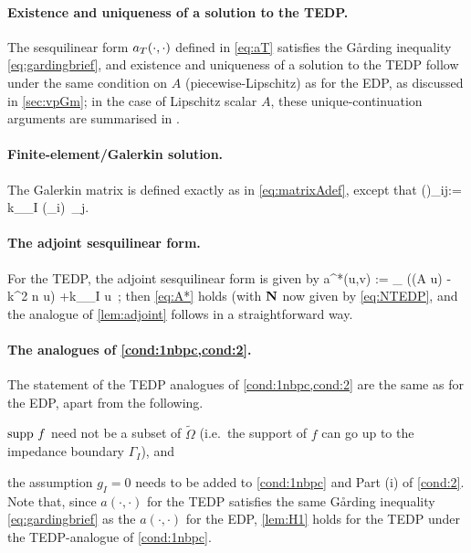 \paragraph{Existence and uniqueness of a solution to the TEDP.} The sesquilinear form $a_{T}(\cdot,\cdot)$ defined in \cref{eq:aT} satisfies the G\aa rding inequality \cref{eq:gardingbrief}, and existence and uniqueness of a solution to the TEDP follow under the same condition on $A$ (piecewise-Lipschitz) as for the EDP, as discussed in \cref{sec:vpGm}; in the case of Lipschitz scalar $A$, these unique-continuation arguments are summarised in \cite[\S2]{GrSa:18}.

\paragraph{Finite-element/Galerkin solution.}
The Galerkin matrix is defined exactly as in \cref{eq:matrixAdef}, except that 
\beq\label{eq:NTEDP}
\big(\Nmat\big)_{ij}:= \ri k\int_{\Gamma_I}  (\gamma\phi_i) \,\gamma \phi_j.
\eeq

\paragraph{The adjoint sesquilinear form.} For the TEDP, the adjoint sesquilinear form is given by 
\beq\label{eq:TEDPadjoint}
a^*(u,v) := \int_{\DR} 
\Big((A \grad u)\cdot\grad \vb
 - k^2 n u\vb\Big) +\ri k\int_{\Gamma_I} \gamma u\, ;
\eeq
then \cref{eq:A*} holds (with $\mathbf{N}$ now given by \cref{eq:NTEDP}, and the analogue of \cref{lem:adjoint} follows in a straightforward way.


\paragraph{The analogues of \cref{cond:1nbpc,cond:2}.}
The statement of the TEDP analogues of \cref{cond:1nbpc,cond:2} are the same as for the EDP, apart from the following.
\ben
\item
$\operatorname{supp} \,f$ need not be a subset of $\widetilde{\Omega}$ (i.e.~the support of $f$ can go up to the impedance boundary $\Gamma_I$), and
\item the assumption $g_I= 0$ needs to be added to \cref{cond:1nbpc} and Part (i) of \cref{cond:2}.
\een
 Note that, since $a(\cdot,\cdot)$ for the TEDP satisfies the same G\aa rding inequality \cref{eq:gardingbrief} as the $a(\cdot,\cdot)$ for the EDP, \cref{lem:H1} holds for the TEDP under the TEDP-analogue of \cref{cond:1nbpc}.

